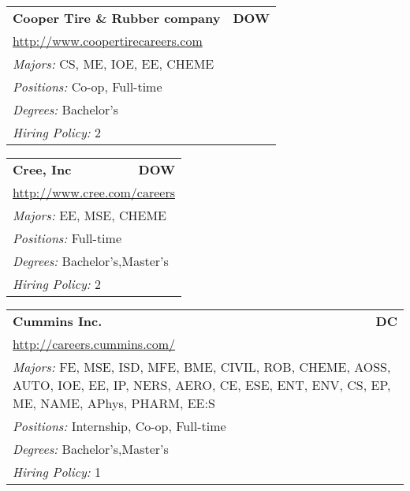 \documentclass[twoside]{article}
\begin{document}
\begin{center}
\begin{multicols}{3}
\begin{FlushLeft}
\begin{minipage}{\columnwidth}
\end{minipage}
 
\begin{minipage}{\columnwidth}\begin{tabularx}{.95\columnwidth}{Xr}
                 {\Large\bf Cooper Tire \& Rubber company} & {\Large\bf DOW}\\
    \multicolumn{2}{p{.95\columnwidth}}{\url{http://www.coopertirecareers.com}}\\
    \multicolumn{2}{p{.95\columnwidth}}{\emph{Majors:} CS, ME, IOE, EE, CHEME}\\
    \multicolumn{2}{p{.95\columnwidth}}{\emph{Positions:} Co-op, Full-time}\\
    \multicolumn{2}{p{.95\columnwidth}}{\emph{Degrees:} Bachelor's}\\
    \multicolumn{2}{p{.95\columnwidth}}{\emph{Hiring Policy:} 2}\\
    \end{tabularx}
    
\end{minipage}
 
\begin{minipage}{\columnwidth}\begin{tabularx}{.95\columnwidth}{Xr}
                 {\Large\bf Cree, Inc} & {\Large\bf DOW}\\
    \multicolumn{2}{p{.95\columnwidth}}{\url{http://www.cree.com/careers}}\\
    \multicolumn{2}{p{.95\columnwidth}}{\emph{Majors:} EE, MSE, CHEME}\\
    \multicolumn{2}{p{.95\columnwidth}}{\emph{Positions:} Full-time}\\
    \multicolumn{2}{p{.95\columnwidth}}{\emph{Degrees:} Bachelor's,Master's}\\
    \multicolumn{2}{p{.95\columnwidth}}{\emph{Hiring Policy:} 2}\\
    \end{tabularx}
    
\end{minipage}
 
\begin{minipage}{\columnwidth}\begin{tabularx}{.95\columnwidth}{Xr}
                 {\Large\bf Cummins Inc.} & {\Large\bf DC}\\
    \multicolumn{2}{p{.95\columnwidth}}{\url{http://careers.cummins.com/}}\\
    \multicolumn{2}{p{.95\columnwidth}}{\emph{Majors:} FE, MSE, ISD, MFE, BME, CIVIL, ROB, CHEME, AOSS, AUTO, IOE, EE, IP, NERS, AERO, CE, ESE, ENT, ENV, CS, EP, ME, NAME, APhys, PHARM, EE:S}\\
    \multicolumn{2}{p{.95\columnwidth}}{\emph{Positions:} Internship, Co-op, Full-time}\\
    \multicolumn{2}{p{.95\columnwidth}}{\emph{Degrees:} Bachelor's,Master's}\\
    \multicolumn{2}{p{.95\columnwidth}}{\emph{Hiring Policy:} 1}\\
    \end{tabularx}
    

\end{minipage}
\end{FlushLeft}
\end{multicols}
\end{center}
\end{document}
